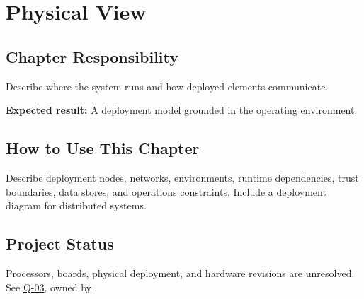 \chapter{Physical View}
\section{Chapter Responsibility}
\label{Section:PhysicalViewResponsibility}
Describe where the system runs and how deployed elements communicate.

\noindent\textbf{Expected result:} A deployment model grounded in the operating environment.

\section{How to Use This Chapter}
Describe deployment nodes, networks, environments, runtime dependencies, trust boundaries, data stores, and operations constraints. Include a deployment diagram for distributed systems.

\section{Project Status}
Processors, boards, physical deployment, and hardware revisions are unresolved.
See \hyperref[Question:Q-03]{Q-03}, owned by \DocumentOwner.
